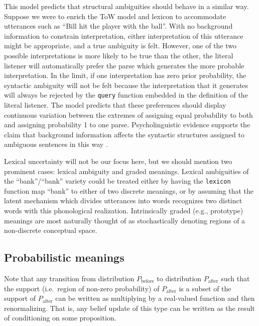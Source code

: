 \documentclass[12pt]{article}
\begin{document}
%
% 

This model predicts that structural ambiguities should behave in a similar way. Suppose we were to enrich the ToW model and lexicon to accommodate utterances such as ``Bill hit the player with the ball''. 
With no background information to constrain interpretation, either interpretation of this utterance might be appropriate, and a true ambiguity is felt. 
However, one of the two possible interpretations is more likely to be true than the other, the literal listener will automatically prefer the parse which generates the more probable interpretation.
In the limit, if one interpretation has zero prior probability, the syntactic ambiguity will not be felt because the interpretation that it generates will always be rejected by the \lstinline{query} function embedded in the definition of the literal listener.
The model predicts that these preferences should display continuous variation between the extremes of assigning equal probability to both and assigning probability 1 to one parse.
Psycholinguistic evidence supports the claim that background information affects the syntactic structures assigned to ambiguous sentences in this way \citep{crainsteedman85,altmannsteedman88,spiveyetal02}.

Lexical uncertainty will not be our focus here, but we should mention two prominent cases: lexical ambiguity and graded meanings. 
Lexical ambiguities of the ``bank''/``bank'' variety could be treated either by having the \lstinline{lexicon} function map ``bank'' to either of two discrete meanings, or by assuming that the latent mechanism which divides utterances into words recognizes two distinct words with this phonological realization.
Intrinsically graded (e.g., prototype) meanings are most naturally thought of as stochastically denoting regions of a non-discrete conceptual space. 

\subsection{Probabilistic meanings}
Note that any transition from distribution $P_{\text{before}}$ to distribution $P_{\text{after}}$ such that the support (i.e.\ region of non-zero probability) of $P_{\text{after}}$ is a subset of the support of $P_{\text{after}}$ can be written as multiplying by a real-valued function and then renormalizing. 
That is, any belief update of this type can be written as the result of conditioning on some proposition.
\end{document}
